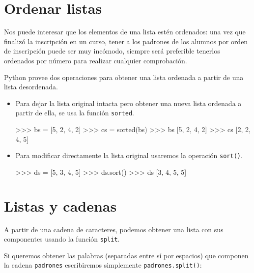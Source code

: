 

\section{Ordenar listas}
\label{ordenar}

Nos puede interesar que los elementos de una lista estén ordenados: una vez
que finalizó la inscripción en un curso, tener a los padrones de los
alumnos por orden de inscripción puede ser muy incómodo, siempre será
preferible tenerlos ordenados por número para realizar cualquier
comprobación.

Python provee dos operaciones para obtener una lista ordenada a partir de
una lista desordenada.

\begin{itemize}

\item Para dejar la lista original intacta pero obtener una nueva lista
ordenada a partir de ella, se usa la función \lstinline!sorted!.\label{sorted}

\begin{codigo-python-sn}
>>> bs = [5, 2, 4, 2]
>>> cs = sorted(bs)
>>> bs
[5, 2, 4, 2]
>>> cs
[2, 2, 4, 5]
\end{codigo-python-sn}

\item Para modificar directamente la lista original usaremos la operación
\lstinline+sort()+.

\begin{codigo-python-sn}
>>> ds = [5, 3, 4, 5]
>>> ds.sort()
>>> ds
[3, 4, 5, 5]
\end{codigo-python-sn}

\end{itemize}

\section{Listas y cadenas}

A partir de una cadena de caracteres, podemos obtener una lista con sus
componentes usando la función \lstinline!split!.

Si queremos obtener las palabras (separadas entre sí por espacios) que
componen la cadena \lstinline!padrones! escribiremos simplemente
\lstinline!padrones.split()!:

